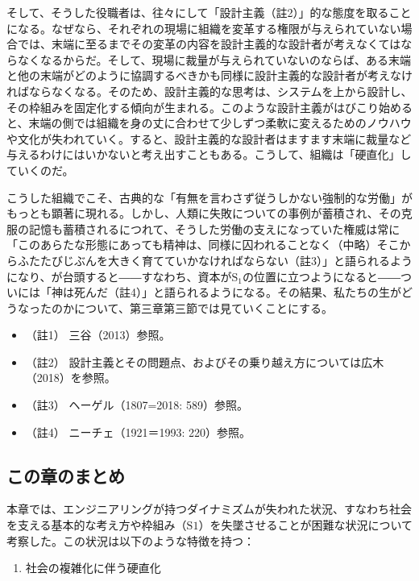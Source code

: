 そして、そうした役職者は、往々にして「設計主義（註2）」的な態度を取ることになる。なぜなら、それぞれの現場に組織を変革する権限が与えられていない場合では、末端に至るまでその変革の内容を設計主義的な設計者が考えなくてはならなくなるからだ。そして、現場に裁量が与えられていないのならば、ある末端と他の末端がどのように協調するべきかも同様に設計主義的な設計者が考えなければならなくなる。そのため、設計主義的な思考は、システムを上から設計し、その枠組みを固定化する傾向が生まれる。このような設計主義がはびこり始めると、末端の側では組織を身の丈に合わせて少しずつ柔軟に変えるためのノウハウや文化が失われていく。すると、設計主義的な設計者はますます末端に裁量など与えるわけにはいかないと考え出すこともある。こうして、組織は「硬直化」していくのだ。

こうした組織でこそ、古典的な「有無を言わさず従うしかない強制的な労働」がもっとも顕著に現れる。しかし、人類に失敗についての事例が蓄積され、その克服の記憶も蓄積されるにつれて、そうした労働の支えになっていた権威は常に「このあらたな形態にあっても精神は、同様に囚われることなく（中略）そこからふたたびじぶんを大きく育てていかなければならない（註3）」と語られるようになり、が台頭すると――すなわち、資本が\(\textrm{S}_1\)の位置に立つようになると――ついには「神は死んだ（註4）」と語られるようになる。その結果、私たちの生がどうなったのかについて、第三章第三節では見ていくことにする。

\begin{itemize}
\tightlist
\item
  （註1） 三谷（2013）\cite{Mitani}参照。
\item
  （註2）
  設計主義とその問題点、およびその乗り越え方については広木（2018）\cite{Hiroki}を参照。
\item
  （註3） ヘーゲル（1807=2018: 589）\cite{Hegel2}参照。
\item
  （註4） ニーチェ（1921＝1993: 220）\cite{Nietzsche3}参照。
\end{itemize}

\subsection{この章のまとめ}\label{ux3053ux306eux7ae0ux306eux307eux3068ux3081}

本章では、\mbox{エンジニアリング}が持つダイナミズムが失われた状況、すなわち社会を支える基本的な考え方や枠組み（\(\textrm{S}1\)）を失墜させることが困難な状況について考察した。この状況は以下のような特徴を持つ：

\begin{enumerate}
\def\labelenumi{\arabic{enumi}.}
\tightlist
\item
  社会の複雑化に伴う硬直化
\end{enumerate}


